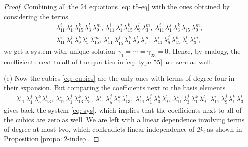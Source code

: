 \documentclass[10pt,a4paper]{amsart}
\begin{document}
\begin{proof}
	Combining all the $24$ equations \eqref{eq: t5-eq} with the ones obtained by considering the terms
	\begin{align*}
		&\lambda_{11}^i\, \lambda_1^j\, \lambda_{15}^k\, \lambda_3^l\, \lambda_9^m,\ 
		\lambda_{11}^i\, \lambda_1^j\, \lambda_{15}^k\, \lambda_9^l\, \lambda_3^m,\ 
		\lambda_{11}^i\, \lambda_1^j\, \lambda_3^k\, \lambda_{15}^l\, \lambda_9^m,\\
		&\lambda_{11}^i\, \lambda_1^j\, \lambda_9^k\, \lambda_3^l\, \lambda_{15}^m,\ 
		\lambda_{11}^i\, \lambda_{15}^j\, \lambda_1^k\, \lambda_9^l\, \lambda_3^m,\ 
		\lambda_{11}^i\, \lambda_9^j\, \lambda_{15}^k\, \lambda_1^l\, \lambda_3^m,
	\end{align*}
	we get a system with unique solution $\gamma_1=\cdots= \gamma_{23}=0$. Hence, by analogy, the coefficients next to all of the quartics in \eqref{eq: type 55} are zero as well.
	
	(e) Now the cubics \eqref{eq: cubics} are the only ones with terms of degree four in their expansion. But comparing the coefficients next to the basis elements 
	\begin{align*}
		&\lambda_{11}^i\, \lambda_1^j\, \lambda_5^k\, \lambda_{13}^l, \ \lambda_{11}^i\,\lambda_1^j\, \lambda_{13}^k\, \lambda_5^l,\
		\lambda_{11}^i\, \lambda_5^j\, \lambda_1^k\, \lambda_{13}^l,\ 
		\lambda_{11}^i\, \lambda_1^j\, \lambda_3^k\, \lambda_9^l,\ 
		\lambda_{11}^i\, \lambda_3^j\, \lambda_1^k\, \lambda_9^l,\ 
		\lambda_{11}^i\, \lambda_9^j\, \lambda_1^k\, \lambda_3^l
	\end{align*}
	 gives back the system \eqref{eq: sys}, which implies that the coefficients next to all of the cubics are zero as well.
	We are left with a linear dependence involving terms of degree at most two, which contradicts linear independence of $\mathcal{B}_2$ as shown in Proposition \ref{propo: 2-indep}.
\end{proof}
\end{document}
